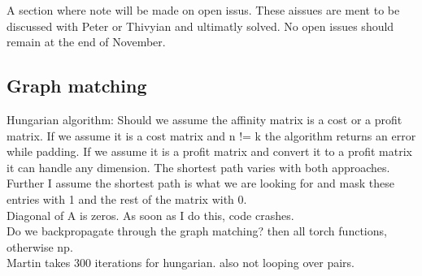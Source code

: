 A section where note will be made on open issus. These aissues are ment to be discussed with Peter or Thivyian and ultimatly solved. No open issues should remain at the end of November.


\subsection{Graph matching}


Hungarian algorithm:
Should we assume the affinity matrix is a cost or a profit matrix. If we assume it is a cost matrix and n != k the algorithm returns an error while padding. If we assume it is a profit matrix and convert it to a profit matrix it can handle any dimension. The shortest path varies with both approaches.
Further I assume the shortest path is what we are looking for and mask these entries with 1 and the rest of the matrix with 0.
\\
Diagonal of A is zeros. As soon as I do this, code crashes.
\\
Do we backpropagate through the graph matching? then all torch functions, otherwise np.
\\
Martin takes 300 iterations for hungarian. also not looping over pairs.
